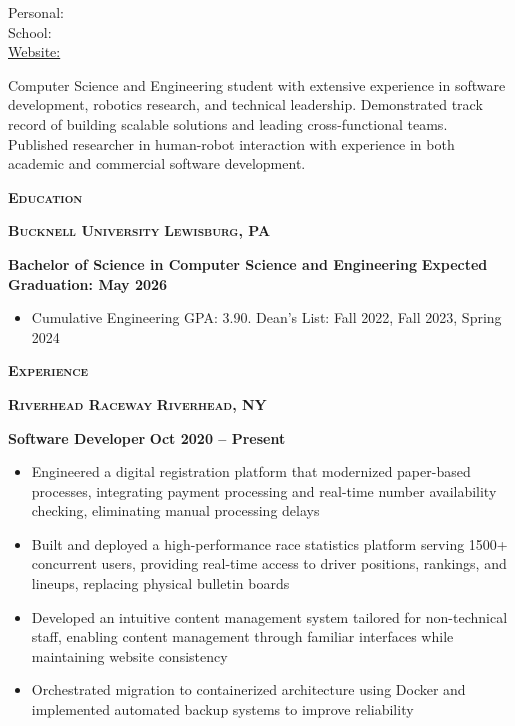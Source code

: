 \documentclass{article}
\newlength{\sectspaceabove}
\newlength{\sectspacebelow}
\newcommand{\textscbf}[1]{\textbf{\textsc{#1}}}
\newcommand{\resumesection}[1]{%
    \vspace{\sectspaceabove}%
    \begin{center}
        \textscbf{#1}
    \end{center}%
    \vspace{\sectspacebelow}%
}
\begin{document}
\begin{center}
    {\large \textscbf{\personalName}}
\end{center}

\noindent
\begin{minipage}[t]{\textwidth} 
    \centering
    \ifx\personalEmail\empty\else
    Personal: \personalEmail\\
    \fi
    \ifx\personalSchoolEmail\empty\else
    School: \personalSchoolEmail\\
    \fi
    \href{https://\personalWebsite}{Website: \personalWebsite}
\end{minipage}

\vspace{1em}

\noindent
\begin{minipage}{\textwidth}
    Computer Science and Engineering student with extensive experience in software development, robotics research, and technical leadership. 
    Demonstrated track record of building scalable solutions and leading cross-functional teams. 
    Published researcher in human-robot interaction with experience in both academic and commercial software development.
\end{minipage}

\resumesection{Education}

\textscbf{Bucknell University} \hfill \textscbf{Lewisburg, PA}

\textbf{Bachelor of Science in Computer Science and Engineering} \hfill \textbf{Expected Graduation: May 2026}
\begin{itemize}[noitemsep,topsep=2pt]
    \item Cumulative Engineering GPA: 3.90. Dean's List: Fall 2022, Fall 2023, Spring 2024
\end{itemize}

\resumesection{Experience}

\textscbf{Riverhead Raceway} \hfill \textscbf{Riverhead, NY}

\textbf{Software Developer} \hfill \textbf{Oct 2020 – Present}
\begin{itemize}[noitemsep,topsep=2pt]
	\item Engineered a digital registration platform that modernized paper-based processes, integrating payment processing and real-time number availability checking, eliminating manual processing delays
	\item Built and deployed a high-performance race statistics platform serving 1500+ concurrent users, providing real-time access to driver positions, rankings, and lineups, replacing physical bulletin boards
	\item Developed an intuitive content management system tailored for non-technical staff, enabling content management through familiar interfaces while maintaining website consistency
	\item Orchestrated migration to containerized architecture using Docker and implemented automated backup systems to improve reliability
\end{itemize}
\end{document}
